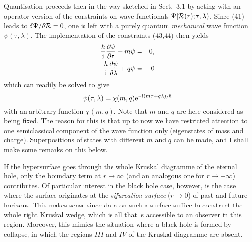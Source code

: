 \documentclass[12pt]{article}
\def\E{{\rm e}}
\def\I{{\rm i}}
\newcommand{\be}{\begin{equation}}
\newcommand{\ee}{\end{equation}}
\newcommand{\bea}{\begin{eqnarray}}
\newcommand{\eea}{\end{eqnarray}}
\begin{document}
Quantisation proceeds then in the way sketched in Sect.~3.1 by
acting with an operator version of the constraints on wave functionals
$\Psi[{\cal R}(r);\tau,\lambda)$. Since (41) leads to
$\delta\Psi/\delta{\cal R}=0$, one is left with a purely
quantum {\em mechanical} wave function $\psi(\tau,\lambda)$.
The implementation of the constraints (43,44) then yields
\bea \frac{\hbar}{\I}\frac{\partial\psi}{\partial\tau}
      +m\psi &=& 0, \\
     \frac{\hbar}{\I}\frac{\partial\psi}{\partial\lambda}
     +q\psi &=& 0 \eea
which can readily be solved to give
\be \psi(\tau,\lambda)= \chi(m,q)\E^{-\I(m\tau+q\lambda)/\hbar} \ee
with an arbitrary function $\chi(m,q)$. 
Note that $m$ and $q$ are here considered as being fixed.
The reason for this is that up to now we have restricted attention
to one semiclassical component of the wave function only
(eigenstates of mass and charge).
Superpositions of states with different $m$ and $q$ can be made,
and I shall make some remarks on this below.

If the hypersurface goes through the whole Kruskal diagramme
of the eternal hole, only the boundary term at $r\to\infty$
(and an analogous one for $r\to-\infty$) contributes. 
Of particular interest in the black hole case, however, is the case
where the surface originates at the {\em bifurcation surface}
($r\to 0$) of past and future horizons. This makes sense since
data on such a surface suffice to construct the whole right
Kruskal wedge, which is all that is accessible to an observer in this
region. Moreover, this mimics the situation where a black hole
is formed by collapse, in which the regions $III$ and $IV$ of the
Kruskal diagramme are absent.
\end{document}
